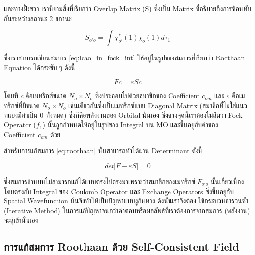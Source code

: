 \noindent และทางฝั่งขวา เรานิยามสิ่งที่เรียกว่า Overlap Matrix (S) ซึ่งเป็น Matrix ที่อธิบายถึงการซ้อนทับกันระหว่างสถานะ 2 สถานะ

\begin{equation}\label{eq:matrix_overlap}
    S_{o'o} = \int \chi^{*}_{o'}(1) \chi_{o}(1) d\tau_{1}
\end{equation}

\noindent ซึ่งเราสามารถเขียนสมการ \ref{eq:lcao_in_fock_int} ให้อยู่ในรูปของสมการที่เรียกว่า Roothaan Equation ได้กระชับ ๆ ดังนี้

\begin{equation}\label{eq:roothaan}
    F c = \varepsilon S c
\end{equation}

\noindent โดยที่ $c$ คือเมทริกซ์ขนาด $N_{o} \times N_{o}$ ซึ่งประกอบไปด้วยสมาชิกของ Coefficient $c_{om}$ และ $\varepsilon$ 
คือเมทริกซ์ที่มีขนาด $N_{o} \times N_{o}$ เช่นเดียวกันซึ่งเป็นเมทริกซ์แบบ Diagonal Matrix (สมาชิกที่ไม่ใช่แนวทแยงมีค่าเป็น 0 ทั้งหมด) 
ซึ่งก็คือพลังงานของ Orbital นั่นเอง ซึ่งตรงจุดนี้เราต้องไม่ลืมว่า Fock Operator ($f_{1}$) นั้นถูกกำหนดให้อยู่ในรูปของ Integral บน MO 
และขึ้นอยู่กับค่าของ Coefficient $c_{om}$ ด้วย

สำหรับการแก้สมการ \ref{eq:roothaan} นั้นสามารถทำได้ผ่าน Determinant ดังนี้

\begin{equation}\label{eq:scf_secular}
    det|F - \varepsilon S| = 0
\end{equation}

\noindent ซึ่งสมการด้านบนไม่สามารถแก้ได้แบบตรงไปตรงมาเพราะว่าสมาชิกของเมทริกซ์ $F_{o'o}$ นั้นเกี่ยวเนื่องโดยตรงกับ Integral ของ 
Coulomb Operator และ Exchange Operators ซึ่งขึ้นอยู่กับ Spatial Wavefunction นั่นจึงทำให้เป็นปัญหาแบบงูกินหาง ดังนั้นเราจึงต้อง%
ใช้กระบวนการวนซ้ำ (Iterative Method) ในการแก้ปัญหาจนกว่าคำตอบหรือผลลัพธ์ที่เราต้องการจากสมการ (พลังงาน) จะลู่เข้านั่นเอง

\subsection{การแก้สมการ Roothaan ด้วย Self-Consistent Field}
\label{ssec:roothaan_scf}

